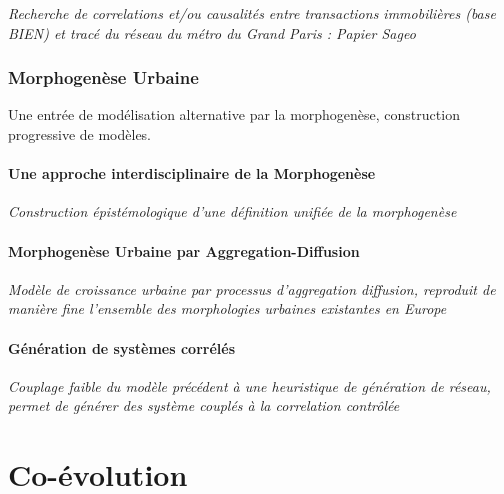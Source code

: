 \textit{Recherche de correlations et/ou causalités entre transactions immobilières (base BIEN) et tracé du réseau du métro du Grand Paris : Papier Sageo}






\section{Morphogenèse Urbaine}

{\color{blue}Une entrée de modélisation alternative par la morphogenèse, construction progressive de modèles.}

\subsection{Une approche interdisciplinaire de la Morphogenèse}

\textit{Construction épistémologique d'une définition unifiée de la morphogenèse~\cite{antelope2016interdisciplinary}}


\subsection{Morphogenèse Urbaine par Aggregation-Diffusion}

\textit{Modèle de croissance urbaine par processus d'aggregation diffusion, reproduit de manière fine l'ensemble des morphologies urbaines existantes en Europe}


\subsection{Génération de systèmes corrélés}

\textit{Couplage faible du modèle précédent à une heuristique de génération de réseau, permet de générer des système couplés à la correlation contrôlée~\cite{raimbault2016generation}}





\part{Co-évolution}


